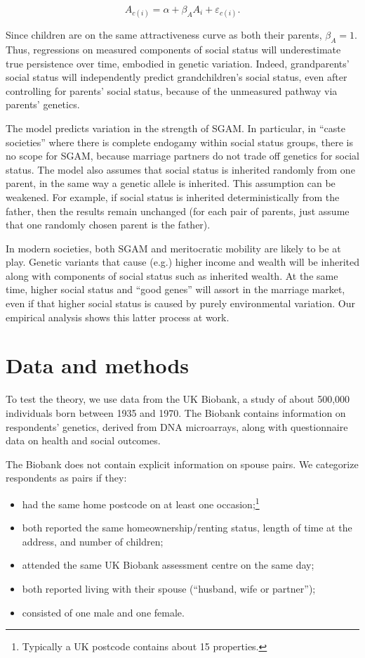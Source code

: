 \documentclass[
]{article}
\providecommand{\tightlist}{%
  \setlength{\itemsep}{0pt}\setlength{\parskip}{0pt}}
\begin{document}
\[
A_{c(i)} = \alpha + \beta_A A_i + \varepsilon_{c(i)}.
\]

Since children are on the same attractiveness curve as both their
parents, \(\beta_A = 1\). Thus, regressions on measured components of
social status will underestimate true persistence over time, embodied in
genetic variation. Indeed, grandparents' social status will
independently predict grandchildren's social status, even after
controlling for parents' social status, because of the unmeasured
pathway via parents' genetics.

The model predicts variation in the strength of SGAM. In particular, in
``caste societies'' where there is complete endogamy within social status
groups, there is no scope for SGAM, because marriage partners do not
trade off genetics for social status. The model also assumes that social
status is inherited randomly from one parent, in the same way a genetic
allele is inherited. This assumption can be weakened. For example, if
social status is inherited deterministically from the father, then the
results remain unchanged (for each pair of parents, just assume that one
randomly chosen parent is the father).

In modern societies, both SGAM and meritocratic mobility are likely to
be at play. Genetic variants that cause (e.g.) higher income and wealth
will be inherited along with components of social status such as
inherited wealth. At the same time, higher social status and ``good
genes'' will assort in the marriage market, even if that higher social
status is caused by purely environmental variation. Our empirical
analysis shows this latter process at work.

\hypertarget{data-and-methods}{%
\section{Data and methods}\label{data-and-methods}}

To test the theory, we use data from the UK Biobank, a study of about
500,000 individuals born between 1935 and 1970. The Biobank contains
information on respondents' genetics, derived from DNA microarrays,
along with questionnaire data on health and social outcomes.

The Biobank does not contain explicit information on spouse pairs. We
categorize respondents as pairs if they:

\begin{itemize}
\tightlist
\item
  had the same home postcode on at least one occasion;\footnote{Typically a UK postcode contains about 15 properties.}
\item
  both reported the same homeownership/renting status, length of time
  at the address, and number of children;
\item
  attended the same UK Biobank assessment centre on the same day;
\item
  both reported living with their spouse (``husband, wife or partner'');
\item
  consisted of one male and one female.
\end{itemize}
\end{document}
